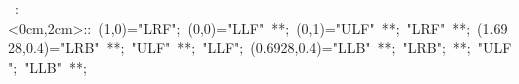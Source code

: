 \hbox{
\xy    <2cm,0cm>:<0cm,2cm>::
       (1,0)="LRF"; (0,0)="LLF" **\dir{-}; (0,1)="ULF" **\dir{-};
       "LRF" **\dir{-}; (1.6928,0.4)="LRB" **\dir{-}; "ULF" **\dir{-};
       "LLF"; (0.6928,0.4)="LLB" **; "LRB"; **;
       "ULF"; "LLB" **;
\endxy}
